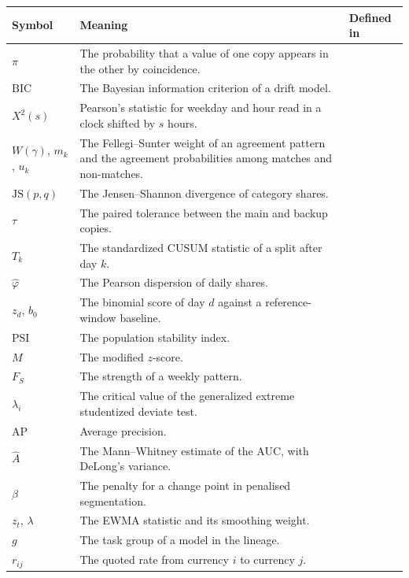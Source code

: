 {\small
\begin{longtable}{@{}QVZ@{}}
\toprule
Symbol & Meaning & Defined in \\
\midrule
\endhead
\bottomrule
\endfoot
$\pi$ & The probability that a value of one copy appears in the other by coincidence. &  \\
$\mathrm{BIC}$ & The Bayesian information criterion of a drift model. &  \\
$X^2(s)$ & Pearson's statistic for weekday and hour read in a clock shifted by $s$ hours. &  \\
$W(\gamma)$, $m_k$, $u_k$ & The Fellegi--Sunter weight of an agreement pattern and the agreement probabilities among matches and non-matches. &  \\
$\mathrm{JS}(p, q)$ & The Jensen--Shannon divergence of category shares. &  \\
$\tau$ & The paired tolerance between the main and backup copies. &  \\
$T_k$ & The standardized CUSUM statistic of a split after day $k$. &  \\
$\hat\varphi$ & The Pearson dispersion of daily shares. &  \\
$z_d$, $b_0$ & The binomial score of day $d$ against a reference-window baseline. &  \\
$\mathrm{PSI}$ & The population stability index. &  \\
$M$ & The modified $z$-score. &  \\
$F_S$ & The strength of a weekly pattern. &  \\
$\lambda_i$ & The critical value of the generalized extreme studentized deviate test. &  \\
$\mathrm{AP}$ & Average precision. &  \\
$\hat A$ & The Mann--Whitney estimate of the AUC, with DeLong's variance. &  \\
$\beta$ & The penalty for a change point in penalised segmentation. &  \\
$z_t$, $\lambda$ & The EWMA statistic and its smoothing weight. &  \\
$g$ & The task group of a model in the lineage. &  \\
$r_{ij}$ & The quoted rate from currency $i$ to currency $j$. &  \\

\end{longtable}}
